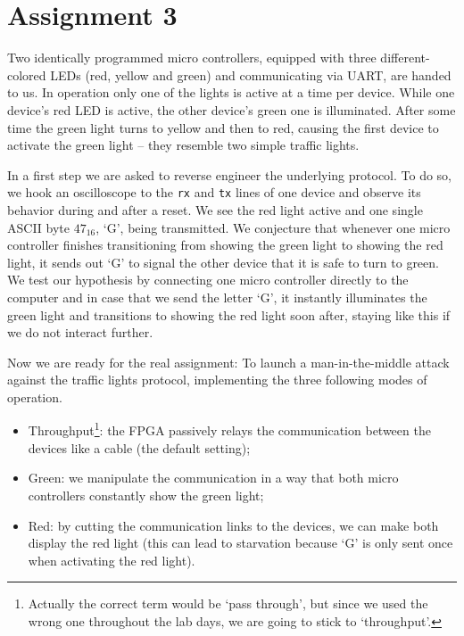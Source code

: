 \section*{Assignment 3}



Two identically programmed micro controllers, equipped with three different-colored LEDs (red, yellow and green) and communicating via UART, are handed to us. 
In operation only one of the lights is active at a time per device. 
While one device's red LED is active, the other device's green one is illuminated. 
After some time the green light turns to yellow and then to red, causing the first device to activate the green light -- they resemble two simple traffic lights. 

In a first step we are asked to reverse engineer the underlying protocol. 
To do so, we hook an oscilloscope to the \texttt{rx} and \texttt{tx} lines of one device and observe its behavior during and after a reset. 
We see the red light active and one single ASCII byte $47_{16}$, `G', being transmitted. 
We conjecture that  whenever one micro controller finishes transitioning from showing the green light to showing the red light, it sends out `G' to signal the other device that it is safe to turn to green. 
We test our hypothesis by connecting one micro controller directly to the computer and in case that we send the letter `G', it instantly illuminates the green light and transitions to showing the red light soon after, staying like this if we do not interact further.

Now we are ready for the real assignment: To launch a man-in-the-middle attack against the traffic lights protocol, implementing the three following modes of operation.

\begin{itemize}
    \item[] \textsf{Throughput}\footnote{Actually the correct term would be `pass through', but since we used the wrong one throughout the lab days, we are going to stick to `throughput'.}: the FPGA passively relays the communication between the devices like a cable (the default setting);
    \item[] \textsf{Green}: we manipulate the communication in a way that both micro controllers constantly show the green light;
    \item[] \textsf{Red}: by cutting the communication links to the devices, we can make both display the red light (this can lead to starvation because `G' is only sent once when activating the red light).
\end{itemize}


